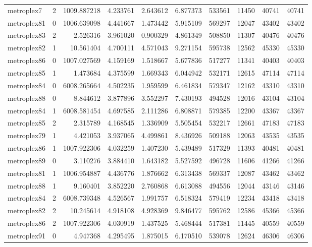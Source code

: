 \documentclass[../../../thesis.tex]{subfiles}
\begin{document}
\begin{longtable}{|l|r|r|r|r|r|r|r|r|r|}
metroplex7 & 2 & 1009.887218 & 4.233761 & 2.643612 & 6.877373 & 533561 & 11450 & 40741 & 40741 \\
metroplex81 & 0 & 1006.639098 & 4.441667 & 1.473442 & 5.915109 & 569297 & 12047 & 43402 & 43402 \\
metroplex83 & 2 & 2.526316 & 3.961020 & 0.900329 & 4.861349 & 508850 & 11307 & 40476 & 40476 \\
metroplex82 & 1 & 10.561404 & 4.700111 & 4.571043 & 9.271154 & 595738 & 12562 & 45330 & 45330 \\
metroplex86 & 0 & 1007.027569 & 4.159169 & 1.518667 & 5.677836 & 517277 & 11341 & 40403 & 40403 \\
metroplex85 & 1 & 1.473684 & 4.375599 & 1.669343 & 6.044942 & 532171 & 12615 & 47114 & 47114 \\
metroplex84 & 0 & 6008.265664 & 4.502235 & 1.959599 & 6.461834 & 579347 & 12162 & 43310 & 43310 \\
metroplex88 & 0 & 8.844612 & 3.877896 & 3.552297 & 7.430193 & 494528 & 12016 & 43104 & 43104 \\
metroplex84 & 1 & 6008.581454 & 4.697585 & 2.111286 & 6.808871 & 579385 & 12200 & 43367 & 43367 \\
metroplex85 & 2 & 2.315789 & 4.168545 & 1.336909 & 5.505454 & 532217 & 12661 & 47183 & 47183 \\
metroplex79 & 1 & 4.421053 & 3.937065 & 4.499861 & 8.436926 & 509188 & 12063 & 43535 & 43535 \\
metroplex86 & 1 & 1007.922306 & 4.032259 & 1.407230 & 5.439489 & 517329 & 11393 & 40481 & 40481 \\
metroplex89 & 0 & 3.110276 & 3.884410 & 1.643182 & 5.527592 & 496728 & 11606 & 41266 & 41266 \\
metroplex81 & 1 & 1006.954887 & 4.436776 & 1.876662 & 6.313438 & 569337 & 12087 & 43462 & 43462 \\
metroplex88 & 1 & 9.160401 & 3.852220 & 2.760868 & 6.613088 & 494556 & 12044 & 43146 & 43146 \\
metroplex84 & 2 & 6008.739348 & 4.526567 & 1.991757 & 6.518324 & 579419 & 12234 & 43418 & 43418 \\
metroplex82 & 2 & 10.245614 & 4.918108 & 4.928369 & 9.846477 & 595762 & 12586 & 45366 & 45366 \\
metroplex86 & 2 & 1007.922306 & 4.030919 & 1.437525 & 5.468444 & 517381 & 11445 & 40559 & 40559 \\
metroplex91 & 0 & 4.947368 & 4.295495 & 1.875015 & 6.170510 & 539078 & 12624 & 46306 & 46306 \\

\end{longtable}
\end{document}
